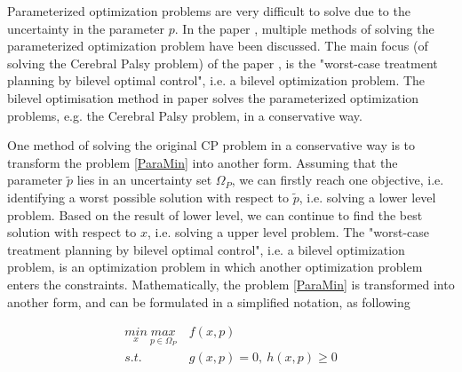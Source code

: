 \documentclass  [
  paper    = a4,
  BCOR     = 10mm,
  twoside,
  fontsize = 12pt,
  fleqn,
  toc      = bibnumbered,
  toc      = listofnumbered,
  numbers  = noendperiod,
  headings = normal,
  listof   = leveldown,
  version  = 3.03
]                                       {scrreprt}
\newcommand{\<}{\langle}
\renewcommand{\>}{\rangle}
\begin{document}
   Parameterized optimization problems are very difficult to solve due to the uncertainty in the parameter $p$. In the paper \cite{MatSch22}, multiple methods of solving the parameterized optimization problem have been discussed. The main focus (of solving the Cerebral Palsy problem) of the paper \cite{MatSch22}, is the "worst-case treatment planning by bilevel optimal control", i.e. a bilevel optimization problem. The bilevel optimisation method in paper \cite{MatSch22} solves the parameterized optimization problems, e.g. the Cerebral Palsy problem, in a conservative way.
   
   
   One method of solving the original CP problem in a conservative way is to transform the problem \ref{ParaMin} into another form. Assuming that the parameter $\tilde{p}$ lies in an uncertainty set $\Omega_P$, we can firstly reach one objective, i.e. identifying a worst possible solution with respect to $\tilde{p}$, i.e. solving a lower level problem. Based on the result of lower level, we can continue to find the best solution with respect to $x$, i.e. solving a upper level problem. The "worst-case treatment planning by bilevel optimal control", i.e. a  bilevel optimization problem, is an optimization problem in which another optimization problem enters the constraints. Mathematically, the problem \ref{ParaMin} is transformed into another form, and can be formulated in a simplified notation, as following
   
   
   
   
   \begin{equation}
   \begin{aligned}
   \underset{x}{min} \   \underset{p \in \Omega_P}{max} & \  f(x,p) \\ 
   s.t.  & \  g(x, p) = 0, \  h(x,p)  \geq  0 \\
   \end{aligned}
   \label{minmax}
   \end{equation}
   
\end{document}
